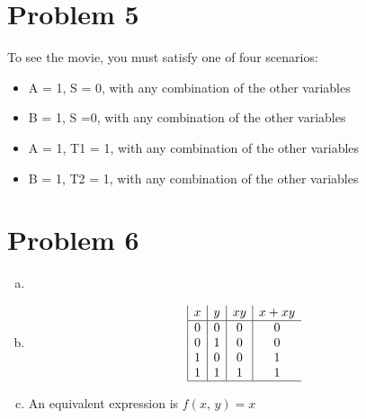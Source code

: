 \documentclass[11pt]{article}
\begin{document}
\section*{Problem 5}
	To see the movie, you must satisfy one of four scenarios:
	
	\begin{itemize}
		\item A = 1, S = 0, with any combination of the other variables
		\item B = 1, S  =0, with any combination of the other variables
		\item A = 1, T1 = 1, with any combination of the other variables
		\item B = 1, T2 = 1, with any combination of the other variables
	\end{itemize}
	

\section*{Problem 6}
	\begin{enumerate}[(a)]
	
	\item {}
	\item
	\begin{displaymath}
	\begin{array}{|c|c|c|c}
	x
	& y
	& xy
	& x + xy \\
	\hline
	0 & 0 & 0 & 0 \\
	0 & 1 & 0 & 0 \\
	1 & 0 & 0 & 1 \\
	1 & 1 & 1 & 1 \\	
	\hline
	\end{array}
	\end{displaymath}		
	
	\item An equivalent expression is $f(x,\, y) = x$
	\end{enumerate}
\end{document}
